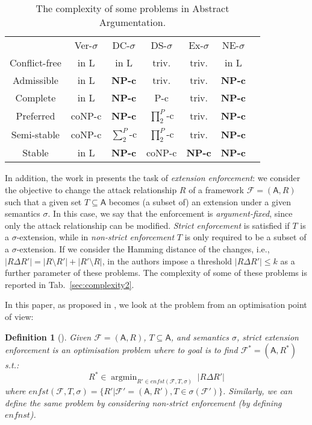 \documentclass[conference,compsocconf]{IEEEtran}
\newtheorem{definition}{Definition}
\DeclareMathOperator*{\argmin}{argmin}
\newcommand{\F}{\ensuremath{\mathcal{F}}\xspace} %
\newcommand{\args}{\ensuremath{\mathsf{A}}\xspace} %
\newcommand{\atts}{\ensuremath{R}\xspace}
\begin{document}
\begin{table}[t]
	\centering
	\footnotesize
	\begin{tabular}{ccccccc}
		&  Ver-$\sigma$ &  DC-$\sigma$ & DS-$\sigma$ & Ex-$\sigma$ &
		NE-$\sigma$  \\
		Conflict-free & in L & in L & triv.& triv. & in L  \\
		Admissible & in L  & \bf{NP-c} & triv. & triv. &  \bf{NP-c}  \\
		Complete & in L &  \bf{NP-c} & P-c & triv. &  \bf{NP-c}  \\
		Preferred & coNP-c &  \bf{NP-c} & $\prod^{P}_{2}$-c& triv. &  \bf{NP-c} \\
		Semi-stable & coNP-c & $\sum^{P}_{2}$-c & $\prod^{P}_{2}$-c & triv. &  \bf{NP-c}  \\
		Stable & in L &  \bf{NP-c} & coNP-c &  \bf{NP-c} &  \bf{NP-c} \\
	\end{tabular}
	\caption{The complexity of some  problems in Abstract Argumentation.}
	\label{sec:complexity}
	\vspace{-0.5cm}
\end{table}

In addition, the work in \cite{extenf1} presents the task of \emph{extension enforcement}: we consider the objective to change the attack relationship $\atts$ of a framework $\F=(\args,\atts)$ such that a given set $T \subseteq \args$ becomes (a subset of) an extension under a given semantics $\sigma$. In this case, we say that the enforcement is \emph{argument-fixed}, since only the attack relationship can be modified. \emph{Strict enforcement} is satisfied if $T$ is a $\sigma$-extension, while in \emph{non-strict enforcement} $T$ is only required to be a subset of a $\sigma$-extension. If we consider the Hamming distance of the changes, i.e., $|R \Delta R'| = |R\setminus R'|+|R'\setminus R|$, in \cite{extenf1} the authors impose a threshold $|R \Delta R'| \leq k$ as a further parameter of these problems. The complexity of some of these problems is reported in Tab.~\ref{sec:complexity2}.

In this paper, as proposed in \cite{extenf}, we look at the problem from an optimisation point of view:

\begin{definition}[\cite{extenf}]
Given $\F=(\args,\atts)$, $T \subseteq \args$, and semantics $\sigma$, strict extension enforcement is an optimisation problem where to goal is to find $\F^\ast=(\args,\atts^\ast)$ s.t.:
$$\atts^\ast \in \argmin_{R' \in \mathit{enfst}(\F, T, \sigma)} \; |R \Delta R'|$$
\noindent where $\mathit{enfst}(\F, T, \sigma)= \{\atts' | \F' =(\args,\atts'), T \in \sigma(\F')\}$. Similarly, we can define the same problem by considering non-strict enforcement (by defining $\mathit{enfnst}$).
\end{definition}
\end{document}

